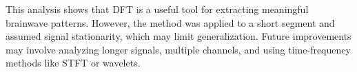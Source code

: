 \documentclass[12pt, a4paper]{article}
\begin{document}
This analysis shows that DFT is a useful tool for extracting meaningful brainwave patterns. However, the method was applied to a short segment and assumed signal stationarity, which may limit generalization. Future improvements may involve analyzing longer signals, multiple channels, and using time-frequency methods like STFT or wavelets.



\end{document}
